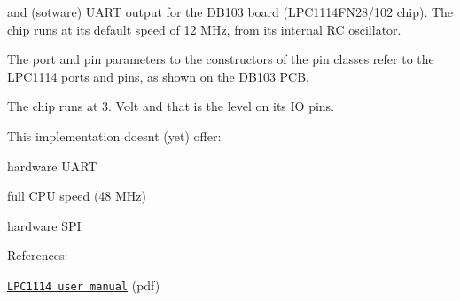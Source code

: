  and (sotware) U\+A\+RT output for the D\+B103 board (L\+P\+C1114\+F\+N28/102 chip). The chip runs at its default speed of 12 M\+Hz, from its internal RC oscillator.

The port and pin parameters to the constructors of the pin classes refer to the L\+P\+C1114 ports and pins, as shown on the D\+B103 P\+CB.

The chip runs at 3. Volt and that is the level on its IO pins.

This implementation doesn\textquotesingle{}t (yet) offer\+:
\begin{DoxyItemize}
\item hardware U\+A\+RT
\item full C\+PU speed (48 M\+Hz)
\item hardware S\+PI
\end{DoxyItemize}

References\+:
\begin{DoxyItemize}
\item \href{http://www.nxp.com/documents/user_manual/UM10398.pdf}{\tt L\+P\+C1114 user manual} (pdf) 
\end{DoxyItemize}